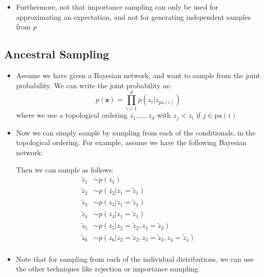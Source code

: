 \begin{itemize}
\begin{itemize}
	\end{itemize}
	\item Furthermore, not that importance sampling can only be used for approximating an expectation, and not for generating independent samples from $p$
\end{itemize}
\subsection{Ancestral Sampling}
\begin{itemize}
	\item Assume we have given a Bayesian network, and want to sample from the joint probability. We can write the joint probability as:
	$$p(\bm{z})=\prod_{i=1}^{d} p(z_i\vert z_{\text{pa}(i)})$$
	where we use a topological ordering $z_1,...,z_d$ with $z_j<z_i$ if $j\in \text{pa}(i)$
	\item Now we can simply sample by sampling from each of the conditionals, in the topological ordering. For example, assume we have the following Bayesian network:
	
	\begin{figure}[ht!]
		\centering
	\end{figure}

	Then we can sample as follows:
	\begin{equation*}
		\begin{split}
			\tilde{z}_1 & \sim p(z_1)\\
			\tilde{z}_2 & \sim p(z_2|z_1=\tilde{z}_1)\\
			\tilde{z}_3 & \sim p(z_3|z_1=\tilde{z}_1)\\
			\tilde{z}_4 & \sim p(z_4|z_1=\tilde{z}_1)\\
			\tilde{z}_5 & \sim p(z_5|z_2=\tilde{z}_2,z_3=\tilde{z}_3)\\
			\tilde{z}_6 & \sim p(z_6|z_2=\tilde{z}_2,z_3=\tilde{z}_3,z_4=\tilde{z}_4)\\
		\end{split}
	\end{equation*}
	
	\item Note that for sampling from each of the individual distributions, we can use the other techniques like rejection or importance sampling. 
	
\end{itemize}
